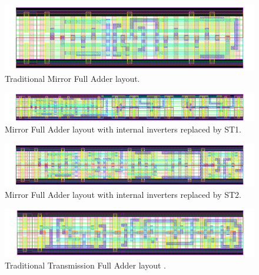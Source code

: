 \documentclass[pgmicro,mestrado,english]{iiufrgs}
\begin{document}
\begin{figure}[]
\centering
\includegraphics[width=1.5\textwidth, angle =90]{CMOS.png}
\caption{Traditional Mirror Full Adder layout.}
\label{fig:CMOS}
\end{figure}

\newpage
\begin{figure}[]
\centering
\includegraphics[width=1.5\textwidth, angle =90]{CMOSST1.png}
\caption{Mirror Full Adder layout with internal inverters replaced by ST1.}
\label{fig:CMOSST1}
\end{figure}

\newpage
\begin{figure}[]
\centering
\includegraphics[width=1.5\textwidth, angle =90]{CMOSST2.png}
\caption{Mirror Full Adder layout with internal inverters replaced by ST2.}
\label{fig:CMOSST2}
\end{figure}





\newpage
\begin{figure}[]
\centering
\includegraphics[width=1.5\textwidth, angle =90]{TFA.png}
\caption{Traditional Transmission Full Adder layout .}
\label{fig:TFA}
\end{figure}
\end{document}
